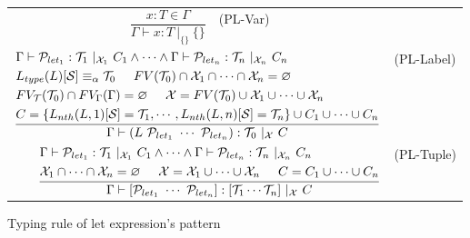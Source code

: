\documentclass{article}
\begin{document}
\begin{figure}
    \centering
    \begin{tabular}{rlrl}
        $\dfrac{x : T \in \Gamma}{\Gamma \vdash x : T\ |_{\{\}}\ \{\}}$ & (PL-Var) \vspace{5mm} \\

        \multicolumn{3}{r}{
        $\dfrac{
        \begin{aligned}
        &\Gamma \vdash \mathcal{P}_{let_1} : \mathcal{T}_1\ |_{\mathcal{X}_1}\ C_1 \land \cdots \land
        \Gamma \vdash \mathcal{P}_{let_n} : \mathcal{T}_n\ |_{\mathcal{X}_n}\ C_n \\
        &L_{type}(L)[\mathcal{S}]\equiv_\alpha \mathcal{T}_0 \hspace{5mm} FV(\mathcal{T}_0) \cap \mathcal{X}_1 \cap \cdots \cap \mathcal{X}_n = \varnothing \\
        &FV_\mathcal{T}(\mathcal{T}_0) \cap FV_\Gamma(\Gamma) = \varnothing \hspace{5mm}
        \mathcal{X} = FV(\mathcal{T}_0) \cup \mathcal{X}_1 \cup \cdots \cup \mathcal{X}_n \\
        &C = \{L_{nth}(L, 1)[\mathcal{S}] = \mathcal{T}_1, \cdots, L_{nth}(L, n)[\mathcal{S}] = \mathcal{T}_n\} \cup C_1 \cup \cdots \cup C_n
        \end{aligned}
        }{\Gamma \vdash (L\ \mathcal{P}_{let_1}\ \cdots\ \mathcal{P}_{let_n}) : \mathcal{T}_0\ |_{\mathcal{X}}\ C}$} & (PL-Label) \vspace{5mm} \\

        \multicolumn{3}{r}{
        $\dfrac{
        \begin{aligned}
        &\Gamma \vdash \mathcal{P}_{let_1} : \mathcal{T}_1\ |_{\mathcal{X}_1}\ C_1 \land \cdots \land
        \Gamma \vdash \mathcal{P}_{let_n} : \mathcal{T}_n\ |_{\mathcal{X}_n}\ C_n \\
        &\mathcal{X}_1 \cap \cdots \cap \mathcal{X}_n = \varnothing \hspace{5mm}
        \mathcal{X} = \mathcal{X}_1 \cup \cdots \cup \mathcal{X}_n \hspace{5mm}
        C = C_1 \cup \cdots \cup C_n
        \end{aligned}
        }{\Gamma \vdash [\mathcal{P}_{let_1}\ \cdots\ \mathcal{P}_{let_n}] : [\mathcal{T}_1 \cdots \mathcal{T}_n]\ |_{\mathcal{X}}\ C}$} & (PL-Tuple) \\
    \end{tabular}
    \caption{Typing rule of let expression's pattern}
\end{figure}
\end{document}

